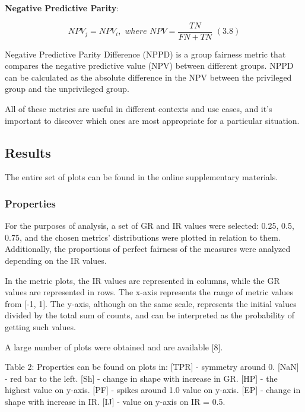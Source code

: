 \documentclass[a4paper, 12pt]{article}
\begin{document}
\bigbreak
\textbf{Negative Predictive Parity}:

\[ NPV_{j} = NPV_{i}, \,\, where \,\, NPV = \frac{TN}{FN + TN} \,\, (3.8) \]

\bigbreak
Negative Predictive Parity Difference (NPPD) is a group fairness metric that compares the negative predictive value (NPV) between different groups. NPPD can be calculated as the absolute difference in the NPV between the privileged group and the unprivileged group.

\bigbreak

All of these metrics are useful in different contexts and use cases, and it's important to discover which ones are most appropriate for a particular situation. 

\subsection{Results}

The entire set of plots can be found in the online supplementary materials.

\subsubsection{Properties}

For the purposes of analysis, a set of GR and IR values were selected: {0.25, 0.5, 0.75}, and the chosen metrics' distributions were plotted in relation to them. Additionally, the proportions of perfect fairness of the measures were analyzed depending on the IR values.

In the metric plots, the IR values are represented in columns, while the GR values are represented in rows. The x-axis represents the range of metric values from [-1, 1]. The y-axis, although on the same scale, represents the initial values divided by the total sum of counts, and can be interpreted as the probability of getting such values.

A large number of plots were obtained and are available [8].
\clearpage

\normalsize 
\begin{flushleft}
Table 2: Properties can be found on plots in: [TPR] - symmetry around 0. [NaN] - red bar to the left. [Sh] - change in shape with increase in GR. [HP] - the highest value on y-axis. [PF] - spikes around 1.0 value on y-axis. [EP] - change in shape with increase in IR. [IJ] - value on y-axis on IR = 0.5.
\end{flushleft}
\end{document}
